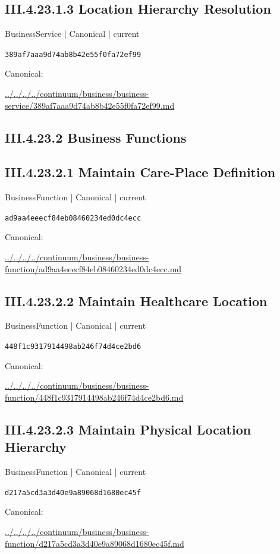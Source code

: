 \documentclass[10pt,a4paper]{article}
\begin{document}
\subsection*{III.4.23.1.3 Location Hierarchy Resolution}
{\small BusinessService | Canonical | current}\par
\texttt{389af7aaa9d74ab8b42e55f0fa72ef99}\par
Canonical: \par
{\footnotesize\url{../../../../continuum/business/business-service/389af7aaa9d74ab8b42e55f0fa72ef99.md}}\par
\subsection*{III.4.23.2 Business Functions}
\subsection*{III.4.23.2.1 Maintain Care-Place Definition}
{\small BusinessFunction | Canonical | current}\par
\texttt{ad9aa4eeecf84eb08460234ed0dc4ecc}\par
Canonical: \par
{\footnotesize\url{../../../../continuum/business/business-function/ad9aa4eeecf84eb08460234ed0dc4ecc.md}}\par
\subsection*{III.4.23.2.2 Maintain Healthcare Location}
{\small BusinessFunction | Canonical | current}\par
\texttt{448f1c9317914498ab246f74d4ce2bd6}\par
Canonical: \par
{\footnotesize\url{../../../../continuum/business/business-function/448f1c9317914498ab246f74d4ce2bd6.md}}\par
\subsection*{III.4.23.2.3 Maintain Physical Location Hierarchy}
{\small BusinessFunction | Canonical | current}\par
\texttt{d217a5cd3a3d40e9a89068d1680ec45f}\par
Canonical: \par
{\footnotesize\url{../../../../continuum/business/business-function/d217a5cd3a3d40e9a89068d1680ec45f.md}}\par
\end{document}
